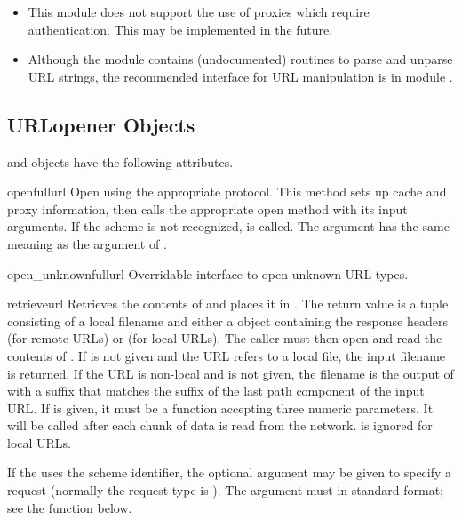 \begin{itemize}
\item
This module does not support the use of proxies which require
authentication.  This may be implemented in the future.

\item
Although the  module contains (undocumented) routines
to parse and unparse URL strings, the recommended interface for URL
manipulation is in module .

\end{itemize}


\subsection{URLopener Objects \label{urlopener-objs}}

 and  objects have the
following attributes.

\begin{methoddesc}[URLopener]{open}{fullurl}
Open  using the appropriate protocol.  This method sets
up cache and proxy information, then calls the appropriate open method with
its input arguments.  If the scheme is not recognized,
 is called.  The  argument
has the same meaning as the  argument of .
\end{methoddesc}

\begin{methoddesc}[URLopener]{open_unknown}{fullurl}
Overridable interface to open unknown URL types.
\end{methoddesc}

\begin{methoddesc}[URLopener]{retrieve}{url}
Retrieves the contents of  and places it in .  The
return value is a tuple consisting of a local filename and either a
 object containing the response headers (for remote
URLs) or  (for local URLs).  The caller must then open and read the
contents of .  If  is not given and the URL
refers to a local file, the input filename is returned.  If the URL is
non-local and  is not given, the filename is the output of
 with a suffix that matches the suffix of the last
path component of the input URL.  If  is given, it must be
a function accepting three numeric parameters.  It will be called after each
chunk of data is read from the network.   is ignored for
local URLs.

If the  uses the  scheme identifier, the optional
 argument may be given to specify a  request
(normally the request type is ).  The  argument
must in standard  format;
see the  function below.
\end{methoddesc}

